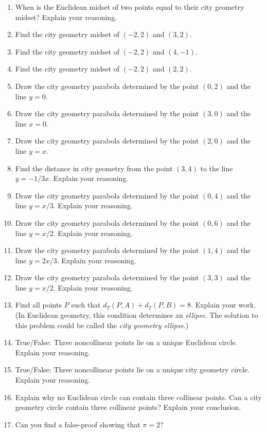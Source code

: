 \begin{enumerate}
\item When is the Euclidean midset of two points equal to their city
  geometry midset? Explain your reasoning.
\item Find the city geometry midset of $(-2,2)$ and $(3,2)$.
\item Find the city geometry midset of $(-2,2)$ and $(4,-1)$.
\item Find the city geometry midset of $(-2,2)$ and $(2,2)$.
\item Draw the city geometry parabola determined by the point $(0,2)$
  and the line $y=0$.
\item Draw the city geometry parabola determined by the point $(3,0)$
  and the line $x=0$.
\item Draw the city geometry parabola determined by the point $(2,0)$ and
the line $y=x$.
\item Find the distance in city geometry from the point $(3,4)$ to the
  line $y = -1/3x$. Explain your reasoning. 
\item Draw the city geometry parabola determined by the point $(0,4)$
  and the line $y=x/3$. Explain your reasoning. 
\item Draw the city geometry parabola determined by the point $(0,6)$
  and the line $y=x/2$. Explain your reasoning. 
\item Draw the city geometry parabola determined by the point $(1,4)$
  and the line $y=2x/3$. Explain your reasoning. 
\item Draw the city geometry parabola determined by the point $(3,3)$
  and the line $y=x/2$. Explain your reasoning. 
\item Find all points $P$ such that $d_T(P,A)+d_T(P,B)=8$. Explain
  your work. (In Euclidean geometry, this condition determines an
  \textit{ellipse}. The solution to this problem could be called the
  \emph{city geometry ellipse}.)

\item True/False: Three noncollinear points lie on a unique Euclidean
  circle. Explain your reasoning.
\item True/False: Three noncollinear points lie on a unique city geometry
  circle. Explain your reasoning.

\item Explain why no Euclidean circle can contain three collinear
  points. Can a city geometry circle contain three collinear points? Explain
  your conclusion.

\item Can you find a false-proof showing that $\pi = 2$?


\end{enumerate}


